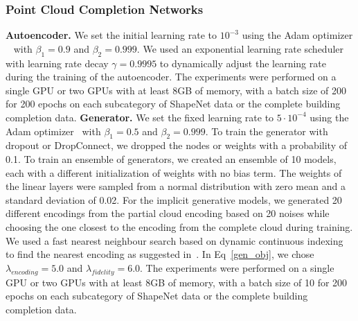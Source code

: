         \subsubsection{Point Cloud Completion Networks}
        \textbf{Autoencoder.}
        We set the initial learning rate to $10^{-3}$ using the Adam optimizer ~\cite{Adam} with $\beta_1 = 0.9$ and $\beta_2 = 0.999$. We used an exponential learning rate scheduler~\cite{ExpLR} with learning rate decay $\gamma = 0.9995$ to dynamically adjust the learning rate during the training of the autoencoder. The experiments were performed on a single GPU or two GPUs with at least 8GB of memory, with a batch size of 200 for 200 epochs on each subcategory of ShapeNet data or the complete building completion data. 
        \newline \textbf{Generator.}
        We set the fixed learning rate to $5\cdot10^{-4}$ using the Adam optimizer~\cite{Adam} with $\beta_1 = 0.5$ and $\beta_2 = 0.999$. To train the generator with dropout or DropConnect, we dropped the nodes or weights with a probability of 0.1. To train an ensemble of generators, we created an ensemble of 10 models, each with a different initialization of weights with no bias term. The weights of the linear layers were sampled from a normal distribution with zero mean and a standard deviation of 0.02. For the implicit generative models, we generated 20 different encodings from the partial cloud encoding based on 20 noises while choosing the one closest to the encoding from the complete cloud during training. We used a fast nearest neighbour search based on dynamic continuous indexing~\cite{DCIkNN} to find the nearest encoding as suggested in~\cite{PCCIMLE}. In Eq~\ref{gen_obj}, we chose $\lambda_{encoding} = 5.0$ and $\lambda_{fidelity} = 6.0$. The experiments were performed on a single GPU or two GPUs with at least 8GB of memory, with a batch size of 10 for 200 epochs on each subcategory of ShapeNet data or the complete building completion data.

